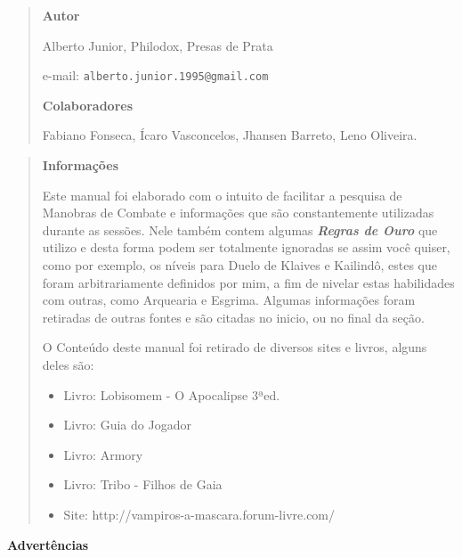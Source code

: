\begin{quote}
\begin{center}
{\Huge \bf Autor}
\end{center}
Alberto Junior, Philodox, Presas de Prata

e-mail: \texttt{alberto.junior.1995@gmail.com}

\begin{center}
{\Large \bf Colaboradores}
\end{center}
Fabiano Fonseca, Ícaro Vasconcelos, Jhansen Barreto, Leno Oliveira.
\end{quote}

\begin{quote}
\begin{center}
{\Huge \bf Informações}
\end{center}
Este manual foi elaborado com o intuito de facilitar a pesquisa de Manobras de Combate e informações que são constantemente utilizadas durante as sessões. Nele também contem algumas {\bf \textit{Regras de Ouro}} que utilizo e desta forma podem ser totalmente ignoradas se assim você quiser, como por exemplo, os níveis para Duelo de Klaives e Kailindô, estes que foram arbitrariamente definidos por mim, a fim de nivelar estas habilidades com outras, como Arquearia e Esgrima. Algumas informações foram retiradas de outras fontes e são citadas no inicio, ou no final da seção.

O Conteúdo deste manual foi retirado de diversos sites e livros, alguns deles são:
\begin{itemize}[noitemsep]
    \item Livro: Lobisomem - O Apocalipse 3ªed.
    \item Livro: Guia do Jogador
    \item Livro: Armory
    \item Livro: Tribo - Filhos de Gaia
    \item Site: http://vampiros-a-mascara.forum-livre.com/
\end{itemize}
\end{quote}


\begin{center}
{\Huge \bf Advertências}
\end{center}

